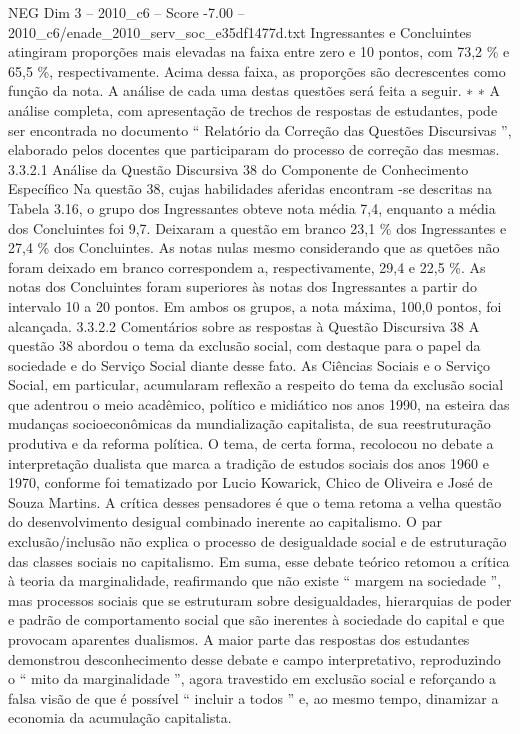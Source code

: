 \begin{textsample}{NEG Dim 3 – 2010\_c6 – Score -7.00 – 2010\_c6/enade\_2010\_serv\_soc\_e35df1477d.txt}
Ingressantes e Concluintes atingiram proporções mais elevadas na faixa entre zero e 10 pontos, com 73,2 \% e 65,5 \%, respectivamente.
Acima dessa faixa, as proporções são decrescentes como função da nota.
A análise de cada uma destas questões será feita a seguir. ∗ ∗ A análise completa, com apresentação de trechos de respostas de estudantes, pode ser encontrada no documento “ Relatório da Correção das Questões Discursivas ”, elaborado pelos docentes que participaram do processo de correção das mesmas. 3.3.2.1 Análise da Questão Discursiva 38 do Componente de Conhecimento Específico Na questão 38, cujas habilidades aferidas encontram -se descritas na Tabela 3.16, o grupo dos Ingressantes obteve nota média 7,4, enquanto a média dos Concluintes foi 9,7.
Deixaram a questão em branco 23,1 \% dos Ingressantes e 27,4 \% dos Concluintes.
As notas nulas mesmo considerando que as quetões não foram deixado em branco correspondem a, respectivamente, 29,4 e 22,5 \%.
As notas dos Concluintes foram superiores às notas dos Ingressantes a partir do intervalo 10 a 20 pontos.
Em ambos os grupos, a nota máxima, 100,0 pontos, foi alcançada. 3.3.2.2 Comentários sobre as respostas à Questão Discursiva 38 A questão 38 abordou o tema da exclusão social, com destaque para o papel da sociedade e do Serviço Social diante desse fato.
As Ciências Sociais e o Serviço Social, em particular, acumularam reflexão a respeito do tema da exclusão social que adentrou o meio acadêmico, político e midiático nos anos 1990, na esteira das mudanças socioeconômicas da mundialização capitalista, de sua reestruturação produtiva e da reforma política.
O tema, de certa forma, recolocou no debate a interpretação dualista que marca a tradição de estudos sociais dos anos 1960 e 1970, conforme foi tematizado por Lucio Kowarick, Chico de Oliveira e José de Souza Martins.
A crítica desses pensadores é que o tema retoma a velha questão do desenvolvimento desigual combinado inerente ao capitalismo.
O par exclusão/inclusão não explica o processo de desigualdade social e de estruturação das classes sociais no capitalismo.
Em suma, esse debate teórico retomou a crítica à teoria da marginalidade, reafirmando que não existe “ margem na sociedade ”, mas processos sociais que se estruturam sobre desigualdades, hierarquias de poder e padrão de comportamento social que são inerentes à sociedade do capital e que provocam aparentes dualismos.
A maior parte das respostas dos estudantes demonstrou desconhecimento desse debate e campo interpretativo, reproduzindo o “ mito da marginalidade ”, agora travestido em exclusão social e reforçando a falsa visão de que é possível “ incluir a todos ” e, ao mesmo tempo, dinamizar a economia da acumulação capitalista.

\end{textsample}
